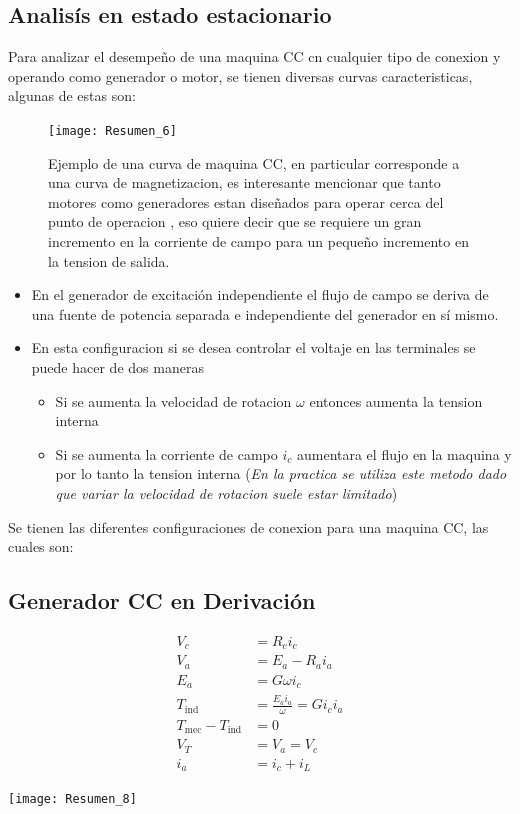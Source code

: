 \documentclass[
  11pt,
  letterpaper,
   addpoints,
   answers
  ]{exam}
\begin{document}
\subsection*{Analisís en estado estacionario}
Para analizar el desempeño de una maquina CC cn cualquier tipo de conexion y operando como generador o motor, se tienen diversas curvas caracteristicas, algunas de estas son:
\begin{figure}[h!]
  \centering
  \texttt{[image: Resumen\_6]}
  \caption{Ejemplo de una curva de maquina CC, en particular corresponde a una curva de magnetizacion, es interesante mencionar que tanto motores como generadores estan diseñados para operar cerca del punto de operacion , eso quiere decir que se requiere un gran incremento en la corriente de campo para un pequeño incremento en la tension de salida.}
\end{figure}
\begin{itemize}
  \item En el generador de excitación independiente el flujo de campo se deriva de una fuente de potencia separada e independiente del generador en sí mismo.
  \item En esta configuracion si se desea controlar el voltaje en las terminales se puede hacer de dos maneras
  \begin{itemize}
    \item Si se aumenta la velocidad de rotacion $\omega$ entonces aumenta la tension interna
    \item Si se aumenta la corriente de campo $i_{c}$ aumentara el flujo en la maquina y por lo tanto la tension interna (\textit{En la practica se utiliza este metodo dado que variar la velocidad de rotacion suele estar limitado})
  \end{itemize} 
\end{itemize}
Se tienen las diferentes configuraciones de conexion para una maquina CC, las cuales son:

\subsection*{Generador CC en Derivación}
\begin{minipage}{0.6\textwidth} %
    \begin{align*}
        V_c &= R_c i_c \\
        V_a &= E_a - R_a i_a \\
        E_a &= G \omega i_c \\
        T_{\text{ind}} &= \frac{E_a i_a}{\omega} = G i_c i_a \\
        T_{\text{mec}} - T_{\text{ind}} &= 0 \\
        V_T &= V_a = V_c \\
        i_a &= i_c + i_L
    \end{align*}
\end{minipage}%
\hfill
\begin{minipage}{0.35\textwidth} %
    \centering
    \texttt{[image: Resumen\_8]} %
\end{minipage}
\vspace{1cm} 
\end{document}
